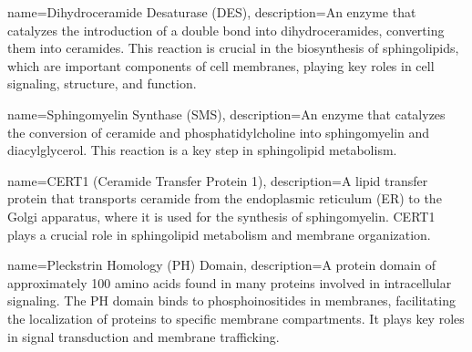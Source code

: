 



{
    name={Dihydroceramide Desaturase (DES)},
    description={An enzyme that catalyzes the introduction of a double bond into dihydroceramides, converting them into ceramides. This reaction is crucial in the biosynthesis of sphingolipids, which are important components of cell membranes, playing key roles in cell signaling, structure, and function.}
}

{
    name={Sphingomyelin Synthase (SMS)},
    description={An enzyme that catalyzes the conversion of ceramide and phosphatidylcholine into sphingomyelin and diacylglycerol. This reaction is a key step in sphingolipid metabolism.}
}

{
    name={CERT1 (Ceramide Transfer Protein 1)},
    description={A lipid transfer protein that transports ceramide from the endoplasmic reticulum (ER) to the Golgi apparatus, where it is used for the synthesis of sphingomyelin. CERT1 plays a crucial role in sphingolipid metabolism and membrane organization. }
}

{
    name={Pleckstrin Homology (PH) Domain},
    description={A protein domain of approximately 100 amino acids found in many proteins involved in intracellular signaling. The PH domain binds to phosphoinositides in membranes, facilitating the localization of proteins to specific membrane compartments. It plays key roles in signal transduction and membrane trafficking.}
}

